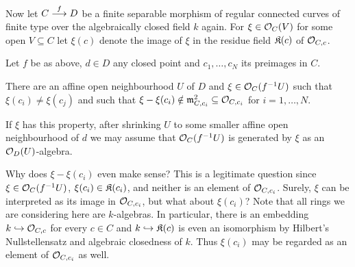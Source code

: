 \documentclass[a4paper,parskip=half,numbers=enddot, DIV=12]{scrreprt}
\begin{document}
Now let $C\morphism[f]D$ be a finite separable morphism of regular connected curves of finite type over the algebraically closed field $k$ again. For $\xi\in\mathcal{O}_C(V)$ for some open $V\subseteq C$ let $\xi(c)$ denote the image of $\xi$ in the residue field $\mathfrak{K}(c)$ of $\mathcal{O}_{C,c}$.
\begin{lem}
	Let $f$ be as above, $d\in D$ any closed point and $c_1,\ldots,c_N$ its preimages in $C$.
	\begin{alphanumerate}
		\item There are an affine open neighbourhood $U$ of $D$ and $\xi\in\mathcal{O}_C(f^{-1}U)$ such that $\xi(c_i)\neq\xi(c_j)$ and such that $\xi-\xi(c_i)\notin\mathfrak{m}_{C,c_i}^2\subseteq\mathcal{O}_{C,c_i}$ for $i=1,\ldots,N$.
		\item If $\xi$ has this property, after shrinking $U$ to some smaller affine open neighbourhood of $d$ we may assume that $\mathcal{O}_C(f^{-1}U)$ is generated by $\xi$ as an $\mathcal{O}_D(U)$-algebra.
	\end{alphanumerate}
\end{lem}
\begin{rem*}
	 Why does $\xi-\xi(c_i)$ even make sense? This is a legitimate question since $\xi\in\mathcal{O}_C(f^{-1}U)$, $\xi(c_i)\in\mathfrak{K}(c_i)$, and neither is an element of $\mathcal{O}_{C,c_i}$. Surely, $\xi$ can be interpreted as its image in $\mathcal{O}_{C,c_i}$, but what about $\xi(c_i)$? Note that all rings we are considering here are $k$-algebras. In particular, there is an embedding $k\monomorphism\Oo_{C,c}$ for every $c\in C$ and $k\monomorphism\KK(c)$ is even an isomorphism by Hilbert's Nullstellensatz and algebraic closedness of $k$. Thus $\xi(c_i)$ may be regarded as an element of $\mathcal{O}_{C,c_i}$ as well.
\end{rem*}
\end{document}
